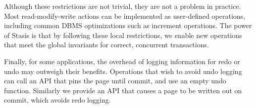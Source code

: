 \documentclass[letterpaper,twocolumn,10pt]{article}
\newcommand{\yad}{Stasis\xspace}
\newcommand{\eat}[1]{}
\begin{document}
Although these restrictions are not trivial, they are not a problem in
practice. Most read-modify-write actions can be implemented as
user-defined operations, including common DBMS optimizations such as
increment operations.  The power of \yad is that by following these
local restrictions, we enable new operations that meet the global
invariants for correct, concurrent transactions.

Finally, for some applications, the overhead of logging information for redo or
undo may outweigh their benefits.  Operations that wish to avoid undo
logging can call an API that pins the page until commit, and use an
empty undo function.  Similarly we provide an API that causes a page
to be written out on commit, which avoids redo logging.


\eat{
Note that we could implement a limited form of transactions by
limiting each transaction to a single operation, and by forcing the
page that each operation updates to disk in order.  If we ignore torn
pages and failed sectors, this does not require any sort of logging,
but is quite inefficient in practice, as it forces the disk to perform
a potentially random write each time the page file is updated.

The rest of this section describes how recovery can be extended,
first to support multiple operations per transaction efficiently, and
then to allow more than one transaction to modify the same data before
committing.
}
\end{document}
